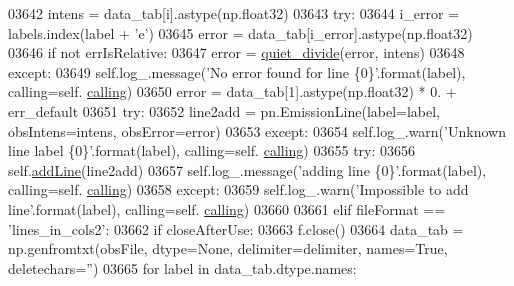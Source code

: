 \begin{DoxyCode}
03642                     intens = data\_tab[i].astype(np.float32)
03643                     \textcolor{keywordflow}{try}:
03644                         i\_error = labels.index(label + \textcolor{stringliteral}{'e'})
03645                         error = data\_tab[i\_error].astype(np.float32)
03646                         \textcolor{keywordflow}{if} \textcolor{keywordflow}{not} errIsRelative:
03647                             error = \hyperlink{namespacepyneb_1_1utils_1_1misc_afa4163f24be7b1472200c24824c72ae1}{quiet\_divide}(error, intens)
03648                     \textcolor{keywordflow}{except}:
03649                         self.log\_.message(\textcolor{stringliteral}{'No error found for line \{0\}'}.format(label), calling=self.
      \hyperlink{classpyneb_1_1core_1_1pynebcore_1_1_observation_a2639fad9af4fefad20e4097295bd40e7}{calling})
03650                         error = data\_tab[1].astype(np.float32) * 0. + err\_default
03651                     \textcolor{keywordflow}{try}:
03652                         line2add = pn.EmissionLine(label=label, obsIntens=intens, obsError=error)
03653                     \textcolor{keywordflow}{except}:
03654                         self.log\_.warn(\textcolor{stringliteral}{'Unknown line label \{0\}'}.format(label), calling=self.
      \hyperlink{classpyneb_1_1core_1_1pynebcore_1_1_observation_a2639fad9af4fefad20e4097295bd40e7}{calling})
03655                     \textcolor{keywordflow}{try}:
03656                         self.\hyperlink{classpyneb_1_1core_1_1pynebcore_1_1_observation_a5f4b01dbeb8d50963fb7fa21b94bfc17}{addLine}(line2add)
03657                         self.log\_.message(\textcolor{stringliteral}{'adding line \{0\}'}.format(label), calling=self.
      \hyperlink{classpyneb_1_1core_1_1pynebcore_1_1_observation_a2639fad9af4fefad20e4097295bd40e7}{calling})
03658                     \textcolor{keywordflow}{except}:
03659                         self.log\_.warn(\textcolor{stringliteral}{'Impossible to add line'}.format(label), calling=self.
      \hyperlink{classpyneb_1_1core_1_1pynebcore_1_1_observation_a2639fad9af4fefad20e4097295bd40e7}{calling})
03660                         
03661         \textcolor{keywordflow}{elif} fileFormat == \textcolor{stringliteral}{'lines\_in\_cols2'}:
03662             \textcolor{keywordflow}{if} closeAfterUse:
03663                 f.close()
03664             data\_tab = np.genfromtxt(obsFile, dtype=\textcolor{keywordtype}{None}, delimiter=delimiter, names=\textcolor{keyword}{True}, deletechars=\textcolor{stringliteral}{''})
03665             \textcolor{keywordflow}{for} label \textcolor{keywordflow}{in} data\_tab.dtype.names:

\end{DoxyCode}
